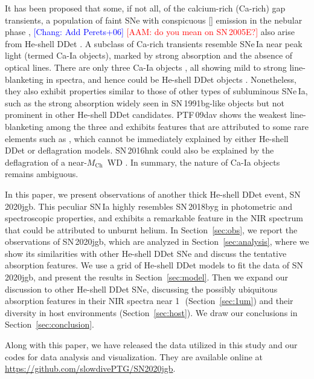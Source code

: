 \documentclass[twocolumn]{aastex631}
\newcommand{\sn}{SN\,2020jgb}
\newcommand{\Mch}{$M_\mathrm{Ch}$}
\newcommand{\adam}[1]{\textcolor{red}{[AAM: #1]}}
\newcommand{\chang}[1]{\textcolor{blue}{[Chang: #1]}}
\begin{document}
It has been proposed that some, if not all, of the calcium-rich (Ca-rich) gap transients, a population of faint SNe with conspicuous [] emission in the nebular phase \citep{Filippenko_2003, Kasliwal_2012}, \chang{Add Perets+06} \adam{do you mean \citep{Perets_2010} on SN\,2005E?} also arise from He-shell DDet \citep{Dessart_2015,de_Ca_rich_2020,polin_nebular_2021}. A subclass of Ca-rich transients resemble SNe\,Ia near peak light (termed Ca-Ia objects), marked by strong  absorption and the absence of optical  lines. There are only three Ca-Ia objects \citep[PTF\,09dav, SN\,2016hnk, and SN\,2019ofm;][]{de_Ca_rich_2020}, all showing mild to strong line-blanketing in spectra, and hence could be He-shell DDet objects \citep[e.g.,][]{jacobson-galan_16hnk_2020}. Nonetheless, they also exhibit properties similar to those of other types of subluminous SNe\,Ia, such as the strong  absorption widely seen in SN\,1991bg-like \citep[91bg-like;][]{Filippenko_91bg_1992} objects  but not prominent in other He-shell DDet candidates. PTF\,09dav shows the weakest line-blanketing among the three and exhibits features that are attributed to some rare elements such as  \citep{Sullivan_2011}, which cannot be immediately explained by either He-shell DDet or deflagration models. SN\,2016hnk could also be explained by the deflagration of a near-\Mch\ WD \citep{galbany_16hnk_2019}. In summary, the nature of Ca-Ia objects remains ambiguous.

In this paper, we present observations of another thick He-shell DDet event, \sn. This peculiar SN\,Ia highly resembles SN\,2018byg in photometric and spectroscopic properties, and exhibits a remarkable feature in the NIR spectrum that could be attributed to unburnt helium. In Section~\ref{sec:obs}, we report the observations of \sn, which are analyzed in Section~\ref{sec:analysis}, where we show its similarities with other He-shell DDet SNe and discuss the tentative  absorption features. We use a grid of He-shell DDet models to fit the data of \sn, and present the results in Section~\ref{sec:model}. Then we expand our discussion to other He-shell DDet SNe, discussing the possibly ubiquitous absorption features in their NIR spectra near 1\,\micron\ (Section~\ref{sec:1um}) and their diversity in host environments (Section~\ref{sec:host}). We draw our conclusions in Section~\ref{sec:conclusion}.

Along with this paper, we have released the data utilized in this study and our codes for data analysis and visualization. They are available online at \url{https://github.com/slowdivePTG/SN2020jgb}.
\end{document}

